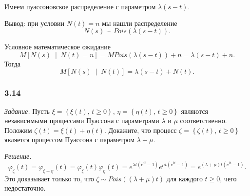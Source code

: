 Имеем пуассоновское распределение с параметром $ \lambda \left( s - t \right) $.

Вывод: при условии $N \left( t \right) = n$ мы нашли распределение
$$N \left( s \right) \sim Pois \left( \lambda \left( s - t \right) \right).$$

Условное математическое ожидание
$$M \left[ N \left( s \right) \; \middle| \; N \left( t \right) = n \right] =
  MPois \left( \lambda \left( s - t \right) \right) + n =
  \lambda \left( s - t \right) + n.$$
Тогда
$$M \left[ N \left( s \right) \; \middle| \; N \left( t \right) \right] =
  \lambda \left( s - t \right) + N \left( t \right).$$

\subsubsection*{3.14}
\textit{Задание.}
Пусть
$ \xi = \left\{ \xi \left( t \right), \, t \geq 0 \right\}, \,
  \eta = \left\{ \eta \left( t \right), \, t \geq 0 \right\} $
являются независимыми процессами Пуассона с параметрами $ \lambda $ и $ \mu $ соответственно.
Положим $ \zeta \left( t \right) = \xi \left( t \right) + \eta \left( t \right) $.
Докажите, что процесс $ \zeta = \left\{ \zeta \left( t \right), \, t \geq 0 \right\} $
является процессом Пуассона с параметром $ \lambda + \mu $.

\textit{Решение.}
$$ \varphi_{ \zeta } \left( t \right) =
  \varphi_{ \xi + \eta } \left( t \right) =
  \varphi_{ \xi } \left( t \right) \varphi_{ \eta } \left( t \right) =
  e^{ \lambda t \left( e^{it} - 1 \right) } e^{ \mu t \left( e^{it} - 1 \right) } =
  e^{ \left( \lambda + \mu \right) t \left( e^{it} - 1 \right) }.$$
Это доказывает только то,
что $ \zeta \sim Pois \left( \left( \lambda + \mu \right) t \right) $ для каждого $t \geq 0$,
чего недостаточно.

